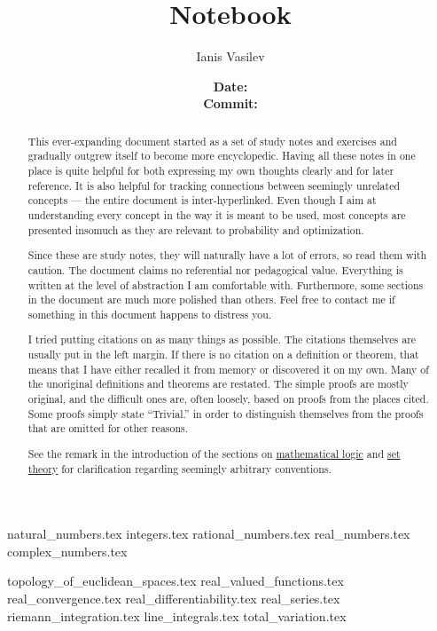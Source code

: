 \documentclass{notebook}
\title{Notebook}
\subtitle{\boldtt{\url{https://github.com/v--/notebook}}}
\author{Ianis Vasilev}
\date
  {
    \normalsize
    \textbf{Date:} \GitCommitInfoDate \\
    \textbf{Commit:} \texttt{\GitCommitInfoHash}
  }
\begin{document}
\maketitle

\begin{abstract}
  This ever-expanding document started as a set of study notes and exercises and gradually outgrew itself to become more encyclopedic. Having all these notes in one place is quite helpful for both expressing my own thoughts clearly and for later reference. It is also helpful for tracking connections between seemingly unrelated concepts --- the entire document is inter-hyperlinked. Even though I aim at understanding every concept in the way it is meant to be used, most concepts are presented insomuch as they are relevant to probability and optimization.

  Since these are study notes, they will naturally have a lot of errors, so read them with caution. The document claims no referential nor pedagogical value. Everything is written at the level of abstraction I am comfortable with. Furthermore, some sections in the document are much more polished than others. Feel free to contact me if something in this document happens to distress you.

  I tried putting citations on as many things as possible. The citations themselves are usually put in the left margin. If there is no citation on a definition or theorem, that means that I have either recalled it from memory or discovered it on my own. Many of the unoriginal definitions and theorems are restated. The simple proofs are mostly original, and the difficult ones are, often loosely, based on proofs from the places cited. Some proofs simply state \enquote{Trivial.} in order to distinguish themselves from the proofs that are omitted for other reasons.

  See the remark in the introduction of the sections on \hyperref[sec:mathematical_logic]{mathematical logic} and \hyperref[sec:set_theory]{set theory} for clarification regarding seemingly arbitrary conventions.
\end{abstract}

\newpage
{}
\tableofcontents
\newpage

{natural_numbers.tex}
{integers.tex}
{rational_numbers.tex}
{real_numbers.tex}
{complex_numbers.tex}

{topology_of_euclidean_spaces.tex}
{real_valued_functions.tex}
{real_convergence.tex}
{real_differentiability.tex}
{real_series.tex}
{riemann_integration.tex}
{line_integrals.tex}
{total_variation.tex}
\end{document}
